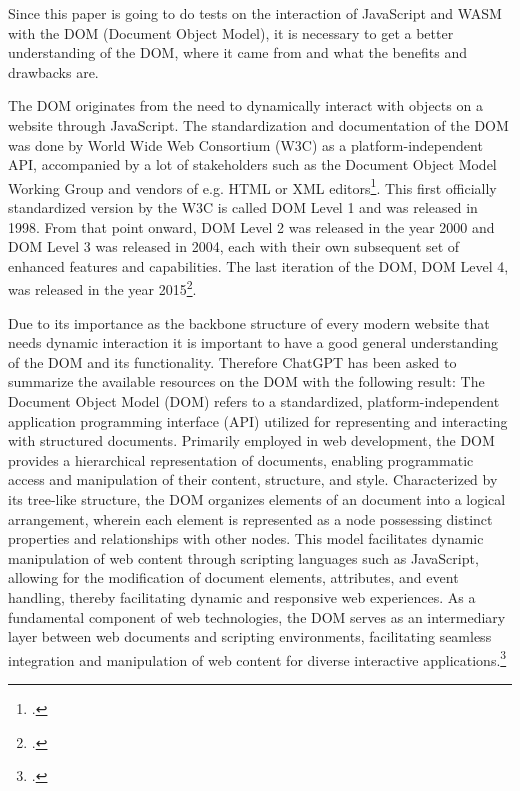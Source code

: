 Since this paper is going to do tests on the interaction of JavaScript and WASM with the DOM (Document Object Model), it is necessary to get a better understanding of the DOM, where it came from and what the benefits and drawbacks are.

The DOM originates from the need to dynamically interact with objects on a website through JavaScript. The standardization and documentation of the DOM was done by World Wide Web Consortium (W3C) as a platform-independent API, accompanied by a lot of stakeholders such as the Document Object Model Working Group and vendors of e.g. HTML or XML editors\footcite{robie_what_nodate}. This first officially standardized version by the W3C is called DOM Level 1 and was released in 1998. From that point onward, DOM Level 2 was released in the year 2000 and DOM Level 3 was released in 2004, each with their own subsequent set of enhanced features and capabilities. The last iteration of the DOM, DOM Level 4, was released in the year 2015\footcite{oladele_what_2022}.

Due to its importance as the backbone structure of every modern website that needs dynamic interaction it is important to have a good general understanding of the DOM and its functionality. Therefore ChatGPT has been asked to summarize the available resources on the DOM with the following result: \dq
The Document Object Model (DOM) refers to a standardized, platform-independent application programming interface (API) utilized for representing and interacting with structured documents. Primarily employed in web development, the  DOM provides a hierarchical representation of documents, enabling programmatic access and manipulation of their content, structure, and style. Characterized by its tree-like structure, the DOM organizes elements of an  document into a logical arrangement, wherein each element is represented as a node possessing distinct properties and relationships with other nodes. This model facilitates dynamic manipulation of web content through scripting languages such as JavaScript, allowing for the modification of document elements, attributes, and event handling, thereby facilitating dynamic and responsive web experiences. As a fundamental component of web technologies, the  DOM serves as an intermediary layer between web documents and scripting environments, facilitating seamless integration and manipulation of web content for diverse interactive applications.\dq\footcite{openai_chatgpt_nodate-2}

